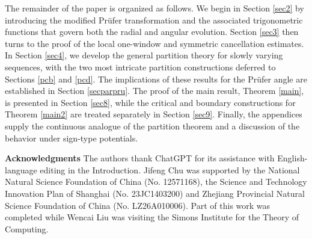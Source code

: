 \documentclass[12pt]{amsart}
\theoremstyle{plain}
\theoremstyle{definition}
\begin{document}
\begin{figure}[H]
	\caption{}
	\label{f1k}
\end{figure}


The remainder of the paper is organized as follows. We begin in Section \ref{sec2} by introducing the modified Prüfer transformation and the associated trigonometric functions that govern both the radial and angular evolution. Section \ref{sec3} then turns to the proof of the local one-window and symmetric cancellation estimates. In Section \ref{sec4}, we develop the general partition theory for slowly varying sequences, with the two most intricate partition constructions deferred to Sections \ref{pcb} and \ref{pcd}. The implications of these results for the Prüfer angle are established in Section \ref{secparpru}. The proof of the main result, Theorem \ref{main}, is presented in Section \ref{sec8}, while the critical and boundary constructions for Theorem \ref{main2} are treated separately in Section \ref{sec9}. Finally, the appendices supply the continuous analogue of the partition theorem and a discussion of the behavior under sign-type potentials.

\vspace{2mm}\noindent \textbf{Acknowledgments} The authors thank ChatGPT for its assistance with English-language
editing in the Introduction. Jifeng Chu was supported by the National Natural Science Foundation of China (No. 12571168), the Science and Technology Innovation Plan of Shanghai (No. 23JC1403200) and
Zhejiang Provincial Natural Science Foundation of China (No. LZ26A010006).
Part of this work was completed while Wencai Liu was visiting the
Simons Institute for the Theory of Computing.
\end{document}
